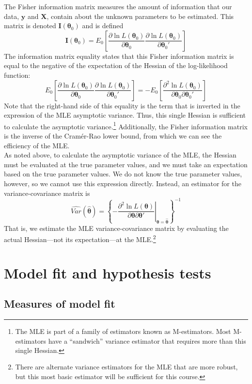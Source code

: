 \documentclass[11pt,letterpaper]{article}
\begin{document}
\noindent The Fisher information matrix measures the amount of information that our data, $\bm{y}$ and $\bm{X}$, contain about the unknown parameters to be estimated. This matrix is denoted $\bm{I}(\bm{\theta}_0)$ and is defined
$$\bm{I}(\bm{\theta}_0) = E_0 \left[ \frac{\partial \ln L(\bm{\theta}_0)}{\partial \bm{\theta}_0} \frac{\partial \ln L(\bm{\theta}_0)}{\partial \bm{\theta}_0'} \right]$$
The information matrix equality states that this Fisher information matrix is equal to the negative of the expectation of the Hessian of the log-likelihood function:
$$E_0 \left[ \frac{\partial \ln L(\bm{\theta}_0)}{\partial \bm{\theta}_0} \frac{\partial \ln L(\bm{\theta}_0)}{\partial \bm{\theta}_0'} \right] = -E_0 \left[ \frac{\partial^2 \ln L(\bm{\theta}_0)}{\partial \bm{\theta}_0 \partial \bm{\theta}_0'} \right]$$
Note that the right-hand side of this equality is the term that is inverted in the expression of the MLE asymptotic variance. Thus, this single Hessian is sufficient to calculate the asymptotic variance.\footnote{The MLE is part of a family of estimators known as M-estimators. Most M-estimators have a ``sandwich'' variance estimator that requires more than this single Hessian.} Additionally, the Fisher information matrix is the inverse of the Cram\'er-Rao lower bound, from which we can see the efficiency of the MLE. \\

\noindent As noted above, to calculate the asymptotic variance of the MLE, the Hessian must be evaluated at the true parameter values, and we must take an expectation based on the true parameter values. We do not know the true parameter values, however, so we cannot use this expression directly. Instead, an estimator for the variance-covariance matrix is
$$\widehat{Var}(\widehat{\bm{\theta}}) = \left\{ \left. -\frac{\partial^2 \ln L(\bm{\theta})}{\partial \bm{\theta} \partial \bm{\theta}'} \right\vert_{\bm{\theta} = \widehat{\bm{\theta}}} \right\}^{-1}$$
That is, we estimate the MLE variance-covariance matrix by evaluating the actual Hessian---not its expectation---at the MLE.\footnote{There are alternate variance estimators for the MLE that are more robust, but this most basic estimator will be sufficient for this course.}

\section{Model fit and hypothesis tests}

\subsection{Measures of model fit}
\end{document}
